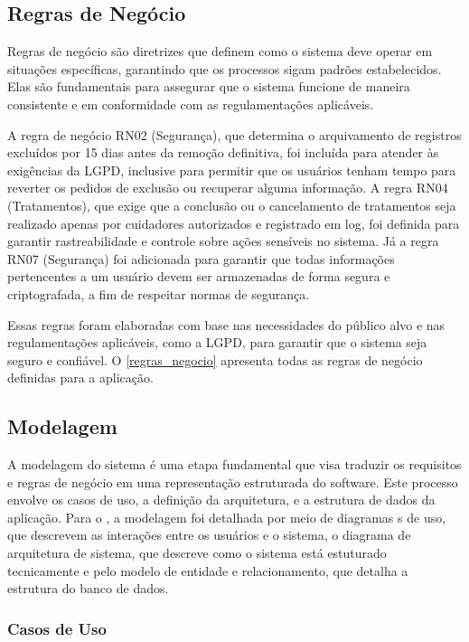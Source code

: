 \documentclass[
	article,			%
	12pt,				%
	oneside,			%
	a4paper,			%
    BIBLATEX,           %
	english,			%
	brazil,				%
	sumario=tradicional
	]{abntex2}
\begin{document}
\subsection{Regras de Negócio}

Regras de negócio são diretrizes que definem como o sistema deve operar em situações específicas, garantindo que os processos sigam padrões estabelecidos. Elas são fundamentais para assegurar que o sistema funcione de maneira consistente e em conformidade com as regulamentações aplicáveis.

A regra de negócio RN02 (Segurança), que determina o arquivamento de registros excluídos por 15 dias antes da remoção definitiva, foi incluída para atender às exigências da LGPD, inclusive para permitir que os usuários tenham tempo para reverter os pedidos de exclusão ou recuperar alguma informação. A regra RN04 (Tratamentos), que exige que a conclusão ou o cancelamento de tratamentos seja realizado apenas por cuidadores autorizados e registrado em log, foi definida para garantir rastreabilidade e controle sobre ações sensíveis no sistema. Já a regra RN07 (Segurança) foi adicionada para garantir que todas informações pertencentes a um usuário devem ser armazenadas de forma segura e criptografada, a fim de respeitar normas de segurança.

Essas regras foram elaboradas com base nas necessidades do público alvo e nas regulamentações aplicáveis, como a LGPD, para garantir que o sistema seja seguro e confiável. O \autoref{regras_negocio} apresenta todas as regras de negócio definidas para a aplicação.

\subsection{Modelagem}

A modelagem do sistema é uma etapa fundamental que visa traduzir os requisitos e regras de negócio em uma representação estruturada do software. Este processo envolve os casos de uso, a definição da arquitetura, e a estrutura de dados da aplicação. Para o \nomeprojeto, a modelagem foi detalhada por meio de diagramas s de uso, que descrevem as interações entre os usuários e o sistema, o diagrama de arquitetura de sistema, que descreve como o sistema está estuturado tecnicamente e pelo modelo de entidade e relacionamento, que detalha a estrutura do banco de dados.

\subsubsection{Casos de Uso}
\end{document}
